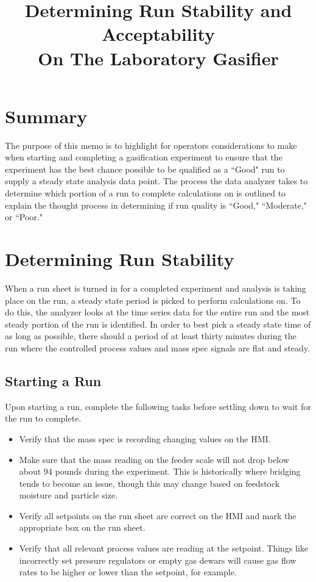 \documentclass[11pt]{article}
\date{}
\title{Determining Run Stability and Acceptability \\ On The Laboratory Gasifier \vspace{-6ex}}
\begin{document}
\maketitle

\section*{Summary}

The purpose of this memo is to highlight for operators considerations to make when starting and completing a gasification experiment to ensure that the experiment has the best chance possible to be qualified as a ``Good" run to supply a steady state analysis data point.  The process the data analyzer takes to determine which portion of a run to complete calculations on is outlined to explain the thought process in determining if run quality is ``Good," ``Moderate," or ``Poor."

\section*{Determining Run Stability}

When a run sheet is turned in for a completed experiment and analysis is taking place on the run, a steady state period is picked to perform calculations on.  To do this, the analyzer looks at the time series data for the entire run and the most steady portion of the run is identified.  In order to best pick a steady state time of as long as possible, there should a period of at least thirty minutes during the run where the controlled process values and mass spec signals are flat and steady.

\subsection*{Starting a Run}

Upon starting a run, complete the following tasks before settling down to wait for the run to complete.

\begin{itemize}
    \item Verify that the mass spec is recording changing values on the HMI.
    \item Make sure that the mass reading on the feeder scale will not drop below about 94 pounds during the experiment.  This is historically where bridging tends to become an issue, though this may change based on feedstock moisture and particle size.
    \item Verify all setpoints on the run sheet are correct on the HMI and mark the appropriate box on the run sheet.
    \item Verify that all relevant process values are reading at the setpoint.  Things like incorrectly set pressure regulators or empty gas dewars will cause gas flow rates to be higher or lower than the setpoint, for example.
\end{itemize}
\end{document}
